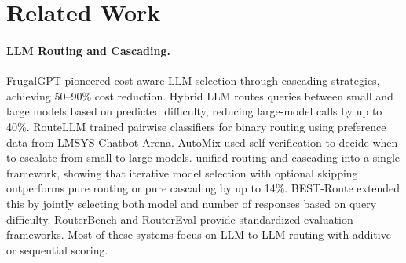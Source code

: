 \section{Related Work}
\label{sec:related}

\paragraph{LLM Routing and Cascading.}
FrugalGPT \citep{chen2023frugalgpt} pioneered cost-aware LLM selection through cascading strategies, achieving 50--90\% cost reduction. Hybrid LLM \citep{ding2024hybridllm} routes queries between small and large models based on predicted difficulty, reducing large-model calls by up to 40\%. RouteLLM \citep{ong2024routellm} trained pairwise classifiers for binary routing using preference data from LMSYS Chatbot Arena. AutoMix \citep{madaan2023automix} used self-verification to decide when to escalate from small to large models. \citet{dekoninck2024cascade} unified routing and cascading into a single framework, showing that iterative model selection with optional skipping outperforms pure routing or pure cascading by up to 14\%. BEST-Route \citep{ding2025bestroute} extended this by jointly selecting both model and number of responses based on query difficulty. RouterBench \citep{hu2024routerbench} and RouterEval \citep{huang2024routereval} provide standardized evaluation frameworks. Most of these systems focus on LLM-to-LLM routing with additive or sequential scoring.

